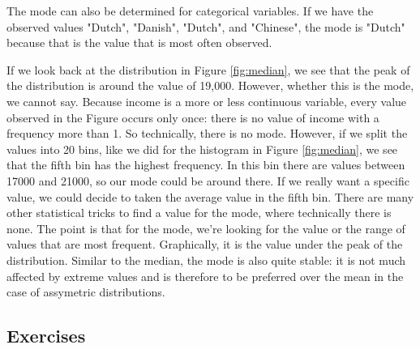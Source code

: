 \documentclass[]{report}\usepackage[]{graphicx}\usepackage[]{color}
\begin{document}
The mode can also be determined for categorical variables. If we have the observed values "Dutch", "Danish", "Dutch", and "Chinese", the mode is "Dutch" because that is the value that is most often observed.

If we look back at the distribution in Figure \ref{fig:median}, we see that the peak of the distribution is around the value of 19,000. However, whether this is the mode, we cannot say. Because income is a more or less continuous variable, every value observed in the Figure occurs only once: there is no value of income with a frequency more than 1. So technically, there is no mode. However, if we split the values into 20 bins, like we did for the histogram in Figure \ref{fig:median}, we see that the fifth bin has the highest frequency. In this bin there are values between 17000 and 21000, so our mode could be around there. If we really want a specific value, we could decide to taken the average value in the fifth bin. There are many other statistical tricks to find a value for the mode, where technically there is none. The point is that for the mode, we're looking for the value or the range of values that are most frequent. Graphically, it is the value under the peak of the distribution. Similar to the median, the mode is also quite stable: it is not much affected by extreme values and is therefore to be preferred over the mean in the case of assymetric distributions.



\subsection{Exercises}
\end{document}
